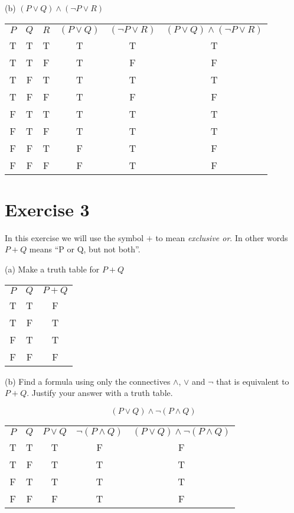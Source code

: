 \documentclass[11pt]{article}
\begin{document}
\noindent (b) $ (P \vee Q) \wedge (\neg P \vee R) $

\begin{center}
\begin{tabular}{ c c c c c c }
 $P$ & $Q$ & $R$ & $(P \vee Q)$ & $(\neg P \vee R)$ & $ (P \vee Q) \wedge (\neg P \vee R) $\\ 
T & T & T & T & T & T\\  
T & T & F & T & F & F\\
T & F & T & T & T & T\\  
T & F & F & T & F & F\\
F & T & T & T & T & T\\  
F & T & F & T & T & T\\
F & F & T & F & T & F\\  
F & F & F & F & T & F
\end{tabular}
\end{center}

\section*{Exercise 3}

In this exercise we will use the symbol $+$ to mean \textit{exclusive or}. In other words $P + Q$ means ``P or Q, but not both''.

\noindent (a) Make a truth table for $P + Q$

\begin{center}
\begin{tabular}{ c c c  }
 $P$ & $Q$ & $P + Q$\\ 
T & T & F\\  
T & F & T\\
F & T & T\\  
F & F & F
\end{tabular}
\end{center}

\noindent (b) Find a formula using only the connectives $\wedge$, $\vee$ and $\neg$ that is equivalent to $P + Q$. Justify your answer with a truth table.

$$(P \vee Q) \wedge \neg (P \wedge Q)$$

\begin{center}
\begin{tabular}{ c c c c c }
 $P$ & $Q$ & $P \vee Q$ & $ \neg (P \wedge Q) $ & $(P \vee Q) \wedge \neg (P \wedge Q)$\\ 
T & T & T & F & F\\  
T & F & T & T & T\\
F & T & T & T & T\\  
F & F & F & T & F
\end{tabular}
\end{center}
\end{document}
